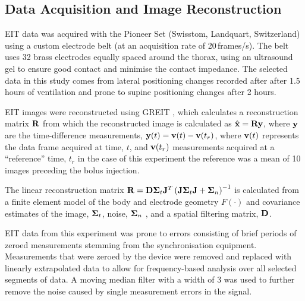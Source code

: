 \subsection{Data Acquisition and Image Reconstruction}

EIT data was acquired with the Pioneer Set (Swisstom, Landquart, Switzerland)
using a custom electrode belt (at an acquisition rate of 20\,frames/s).
The belt uses 32 brass electrodes equally spaced around the thorax, 
using an ultrasound gel to ensure good contact and minimise the contact impedance. 
The selected data in this study comes from lateral positioning changes recorded after
after 1.5 hours of ventilation and prone to supine positioning changes after 
2 hours.

EIT images were 
reconstructed using GREIT \parencite{Adler2009}, %
which
calculates a reconstruction matrix $\mathbf{R}$ from which
the reconstructed image is calculated as $\hat{\mathbf{x}} = \mathbf{R} \mathbf{y}$,
where $\mathbf{y}$ are the time-difference
measurements,
$\mathbf{y}(t) = \mathbf{v}(t) - \mathbf{v}(t_r)$,
where $\mathbf{v}(t)$ represents 
the data frame acquired at time, $t$,
and $\mathbf{v}(t_r)$ measurements acquired at a 
``reference'' time, $t_r$ 
in the case of this experiment the reference was
a mean of 10 images preceding the bolus injection.

The linear reconstruction matrix $\mathbf{R}
 = \mathbf{D} \boldsymbol{\Sigma}_t \mathbf{J}^T 
    \left(
       \mathbf{J} \boldsymbol{\Sigma}_t \mathbf{J} + \boldsymbol{\Sigma}_n
    \right)^{-1}
$ is calculated from a
finite element model of the body and electrode geometry
$F(\cdot)$ and covariance estimates of the image, $\boldsymbol{\Sigma}_t$, 
noise, $\boldsymbol{\Sigma}_n$ \parencite{Grychtol2016}, %
and
a spatial filtering matrix, $\mathbf{D}$.

EIT data from this experiment was prone to errors consisting of brief 
periods of zeroed measurements stemming 
from the synchronisation equipment. 
Measurements that were zeroed by the device were removed and replaced with linearly  
extrapolated data to allow for frequency-based analysis over all selected segments
of data.
A moving median filter with a width of 3 was used to further remove the
noise caused by single measurement errors in the signal.

%

